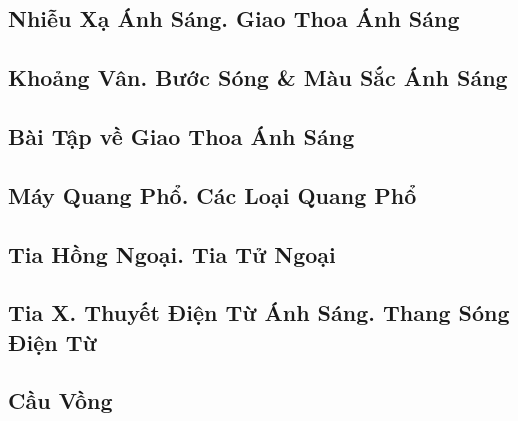 \documentclass{article}
\numberwithin{equation}{section}
\begin{document}

\subsection{Nhiễu Xạ Ánh Sáng. Giao Thoa Ánh Sáng}


\subsection{Khoảng Vân. Bước Sóng \& Màu Sắc Ánh Sáng}


\subsection{Bài Tập về Giao Thoa Ánh Sáng}


\subsection{Máy Quang Phổ. Các Loại Quang Phổ}


\subsection{Tia Hồng Ngoại. Tia Tử Ngoại}


\subsection{Tia X. Thuyết Điện Từ Ánh Sáng. Thang Sóng Điện Từ}


\subsection{Cầu Vồng}

\end{document}

